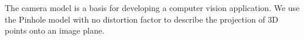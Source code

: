 \documentclass[graybox]{svmult}
\begin{document}

The camera model is a basis for developing a computer vision application. We use the Pinhole model with no distortion factor to describe the projection of 3D points onto an image plane. %
\end{document}
